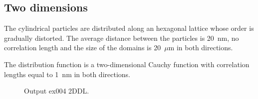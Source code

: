 
\subsection{Two dimensions}
The cylindrical particles are distributed along an hexagonal lattice whose order is gradually distorted.
The average distance between the particles is 20~nm, no correlation length and the size of the domains is 20~$\mu$m in both directions.

The distribution function is a two-dimensional Cauchy function with correlation lengths equal to 1~nm in both directions.

\begin{figure}[H]
\hfill
{}
\hfill
{}
\hfill
\caption{Output ex004 2DDL.}
\end{figure}


